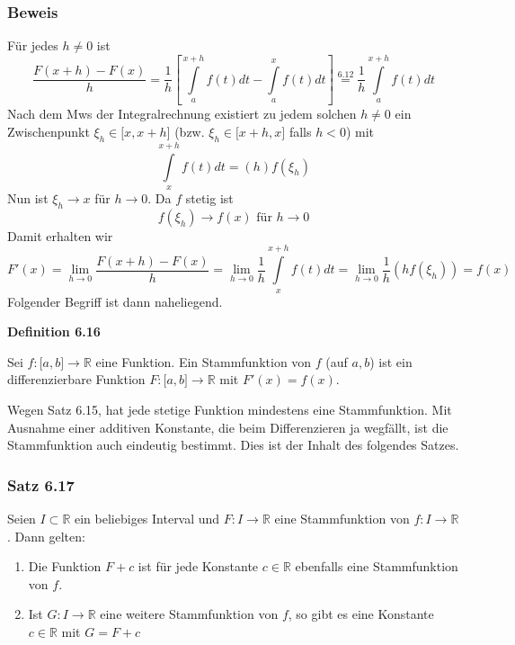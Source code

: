 \subsubsection*{Beweis}
Für jedes $h\neq 0$ ist \[\frac{{F(x + h) - F(x)}}{h} = \frac{1}{h}\left[ {\int\limits_a^{x + h} {f(t)dt}  - \int\limits_a^x {f(t)dt} } \right] \mathop  = \limits^{6.12}  \frac{1}{h}\int\limits_a^{x + h} {f(t)dt} \]
Nach dem Mws der Integralrechnung existiert zu jedem solchen $h\neq 0$ ein Zwischenpunkt $\xi_h\in\lbrack x,x+h\rbrack$ (bzw. $\xi_h\in\lbrack x + h,x\rbrack$ falls $h<0$) mit \[\int\limits_x^{x + h} {f(t)dt = (h)f({\xi _h})} \]
Nun ist $\xi_h \rightarrow x$ für $h\rightarrow 0$. Da $f$ stetig ist $$f(\xi_h)\rightarrow f(x) \text{ für } h\rightarrow 0$$
Damit erhalten wir \[F'(x) = \mathop {\lim }\limits_{h \to 0} \frac{{F(x + h) - F(x)}}{h} = \mathop {\lim }\limits_{h \to 0} \frac{1}{h}\int\limits_x^{x + h} {f(t)dt = } \mathop {\lim }\limits_{h \to 0} \frac{1}{h}(hf({\xi _h})) = f(x)\]
Folgender Begriff ist dann naheliegend. \\

\begin{framed}
\centerline{\textbf{Definition 6.16}}
\noindent Sei $f:\lbrack a,b\rbrack\rightarrow\mathbb{R}$ eine Funktion. Ein Stammfunktion von $f$ (auf $a,b$) ist ein differenzierbare Funktion $F:\lbrack a,b\rbrack\rightarrow\mathbb{R}$ mit $F'(x)=f(x)$.\\
\end{framed}
\noindent Wegen Satz 6.15, hat jede stetige Funktion mindestens eine Stammfunktion. Mit Ausnahme einer additiven Konstante, die beim Differenzieren ja wegfällt, ist die Stammfunktion auch eindeutig bestimmt. Dies ist der Inhalt des folgendes Satzes.\\

\subsubsection*{Satz 6.17}
Seien $I\subset \mathbb{R}$ ein beliebiges Interval und $F:I\rightarrow\mathbb{R}$ eine Stammfunktion von $f:I\rightarrow\mathbb{R}$. Dann gelten:
\begin{enumerate}[\indent (a)]
\item Die Funktion $F+c$ ist für jede Konstante $c\in\mathbb{R}$ ebenfalls eine Stammfunktion von $f$.
\item Ist $G:I\rightarrow\mathbb{R}$ eine weitere Stammfunktion von $f$, so gibt es eine Konstante $c\in\mathbb{R}$ mit $G=F+c$
\end{enumerate}

